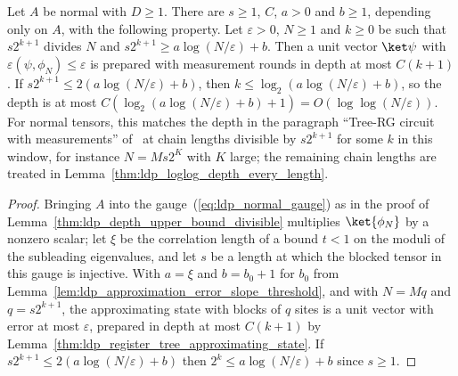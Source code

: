 \begin{lemma}
    \label{thm:ldp_loglog_depth}
    \leanok
    Let $A$ be normal with $D\ge1$. There are $s\ge1$, $C$, $a>0$ and $b\ge1$,
    depending only on $A$, with the following property. Let $\varepsilon>0$,
    $N\ge1$ and $k\ge0$ be such that $s2^{k+1}$ divides $N$ and
    $s2^{k+1}\ge a\log(N/\varepsilon)+b$. Then a unit vector $\ket\psi$ with
    $\varepsilon(\psi,\phi_N)\le\varepsilon$ is prepared with measurement
    rounds in depth at most $C(k+1)$. If
    $s2^{k+1}\le2(a\log(N/\varepsilon)+b)$, then
    $k\le\log_2(a\log(N/\varepsilon)+b)$, so the depth is at most
    $C(\log_2(a\log(N/\varepsilon)+b)+1)=O(\log\log(N/\varepsilon))$. For
    normal tensors, this matches the depth in the paragraph ``Tree-RG circuit with
    measurements'' of~\cite{Malz2024Preparation} at chain lengths divisible by
    $s2^{k+1}$ for some $k$ in this window, for instance $N=Ms2^K$ with $K$
    large; the remaining chain lengths are treated in
    Lemma~\ref{thm:ldp_loglog_depth_every_length}.
\end{lemma}
\begin{proof}
    \leanok
    Bringing $A$ into the gauge~(\ref{eq:ldp_normal_gauge}) as in the proof of
    Lemma~\ref{thm:ldp_depth_upper_bound_divisible} multiplies
    $\ket{\phi_N}$ by a nonzero scalar; let $\xi$ be the correlation length of a
    bound $t<1$ on the moduli of the subleading eigenvalues, and let $s$ be a
    length at which the blocked tensor in this gauge is injective. With $a=\xi$
    and $b=b_0+1$ for $b_0$ from
    Lemma~\ref{lem:ldp_approximation_error_slope_threshold}, and with $N=Mq$ and
    $q=s2^{k+1}$, the approximating state with blocks of $q$ sites is a unit
    vector with error at most $\varepsilon$, prepared in depth at most
    $C(k+1)$ by Lemma~\ref{thm:ldp_register_tree_approximating_state}. If
    $s2^{k+1}\le2(a\log(N/\varepsilon)+b)$ then $2^k\le
        a\log(N/\varepsilon)+b$ since $s\ge1$.
\end{proof}
